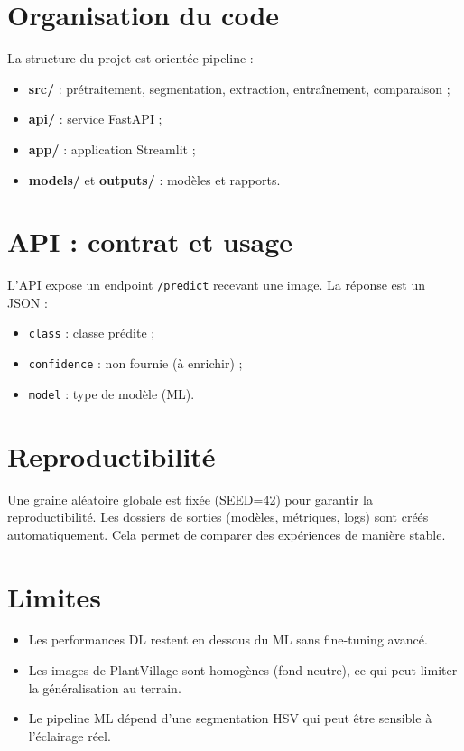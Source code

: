 \documentclass[12pt,a4paper]{article}
\begin{document}
\section{Organisation du code}
La structure du projet est orient\'ee pipeline :
\begin{itemize}[leftmargin=*]
    \item \textbf{src/} : pr\'etraitement, segmentation, extraction, entra\^inement, comparaison ;
    \item \textbf{api/} : service FastAPI ;
    \item \textbf{app/} : application Streamlit ;
    \item \textbf{models/} et \textbf{outputs/} : mod\`eles et rapports.
\end{itemize}

\section{API : contrat et usage}
L'API expose un endpoint \texttt{/predict} recevant une image. La r\'eponse est un JSON :
\begin{itemize}[leftmargin=*]
    \item \texttt{class} : classe pr\'edite ;
    \item \texttt{confidence} : non fournie (\`a enrichir) ;
    \item \texttt{model} : type de mod\`ele (ML).
\end{itemize}

\section{Reproductibilit\'e}
Une graine al\'eatoire globale est fix\'ee (SEED=42) pour garantir la reproductibilit\'e. Les dossiers de sorties (mod\`eles, m\'etriques, logs) sont cr\'e\'es automatiquement. Cela permet de comparer des exp\'eriences de mani\`ere stable.

\section{Limites}
\begin{itemize}[leftmargin=*]
    \item Les performances DL restent en dessous du ML sans fine-tuning avanc\'e.
    \item Les images de PlantVillage sont homog\`enes (fond neutre), ce qui peut limiter la g\'en\'eralisation au terrain.
    \item Le pipeline ML d\'epend d'une segmentation HSV qui peut \^etre sensible \`a l'\'eclairage r\'eel.
\end{itemize}
\end{document}

